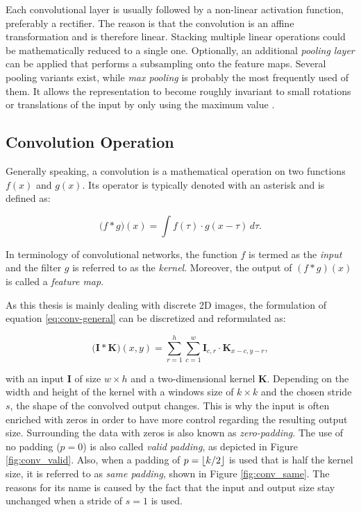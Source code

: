 Each convolutional layer is usually followed by a non-linear activation function, preferably a rectifier. The reason is that the convolution is an affine transformation and is therefore linear. Stacking multiple linear operations could be mathematically reduced to a single one. Optionally, an additional \textit{pooling layer} can be applied that performs a subsampling onto the feature maps. Several pooling variants exist, while \textit{max pooling} is probably the most frequently used of them. It allows the representation to become roughly invariant to small rotations or translations of the input by only using the maximum value \parencite[p. 343]{deep_learning}.


\subsection{Convolution Operation} \label{sec:conv-op}

Generally speaking, a convolution is a mathematical operation on two functions $f(x)$ and $g(x)$. Its operator is typically denoted with an asterisk \parencite[p. 332]{deep_learning} and is defined as:

\begin{equation} \label{eq:conv-general}
  \big(f \ast g\big)(x) = \int f(\tau) \cdot g(x-\tau) \, d\tau .
\end{equation}

In terminology of convolutional networks, the function $f$ is termed as the \textit{input} and the filter $g$ is referred to as the \textit{kernel}. Moreover, the output of $ (f \ast g)(x) $ is called a \textit{feature map}.

As this thesis is mainly dealing with discrete 2D images, the formulation of equation \ref{eq:conv-general} can be discretized and reformulated as:

\begin{equation} \label{eq:conv-2d}
  \big(\textbf{I} \ast \textbf{K}\big)(x,y) = \sum\limits_{r=1}^{h} \sum\limits_{c=1}^{w} \textbf{I}_{c,r} \cdot \textbf{K}_{x-c,y-r} ,
\end{equation}

with an input $ \textbf{I} $ of size $w \times h$ and a two-dimensional kernel $ \textbf{K} $. Depending on the width and height of the kernel with a windows size of $ k \times k $ and the chosen stride $ s $, the shape of the convolved output changes. This is why the input is often enriched with zeros in order to have more control regarding the resulting output size. Surrounding the data with zeros is also known as \textit{zero-padding}. The use of no padding ($p=0$) is also called \textit{valid padding}, as depicted in Figure \ref{fig:conv_valid}. Also, when a padding of $p=\lfloor k/2\rfloor$ is used that is half the kernel size, it is referred to as \textit{same padding}, shown in Figure \ref{fig:conv_same}. The reasons for its name is caused by the fact that the input and output size stay unchanged when a stride of $ s=1 $ is used.

